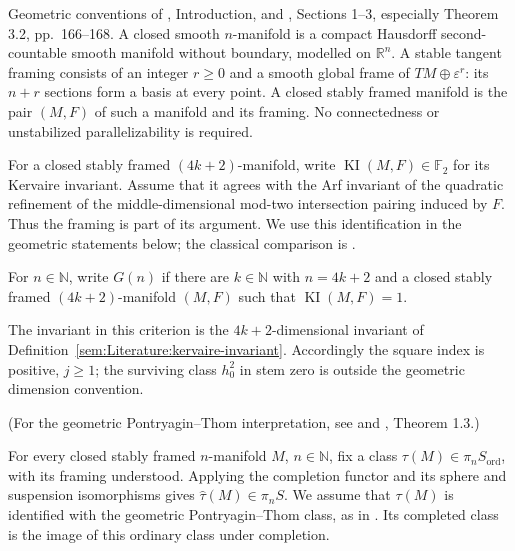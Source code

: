 \begin{definition}
\label{sem:Literature:closed-framed-manifolds}
\label{sem:Literature:kervaire-invariant}
\label{sem:Literature:kervaire-existence}
Geometric conventions of \cite{LWX126}, Introduction, and
\cite{Browder}, Sections 1--3, especially Theorem 3.2, pp.~166--168.
A closed smooth $n$-manifold is a compact Hausdorff second-countable
smooth manifold without boundary, modelled on $\mathbb R^n$.
A stable tangent framing consists of an integer $r\ge0$ and a smooth
global frame of $TM\oplus\varepsilon^r$: its $n+r$ sections form a
basis at every point. A closed stably framed manifold is the pair
$(M,F)$ of such a manifold and its framing. No connectedness or
unstabilized parallelizability is required.

For a closed stably framed $(4k+2)$-manifold, write
$\operatorname{KI}(M,F)\in\mathbb F_2$ for its Kervaire invariant.
Assume that it agrees with the Arf invariant of the quadratic refinement
of the middle-dimensional mod-two intersection pairing induced by $F$.
Thus the framing is part of its argument. We use this identification
in the geometric statements below; the classical comparison is
\cite[Theorem 3.2]{Browder}.

For $n\in\mathbb N$, write $G(n)$ if there are $k\in\mathbb N$ with
$n=4k+2$ and a closed stably framed $(4k+2)$-manifold $(M,F)$ such that
$\operatorname{KI}(M,F)=1$.

\end{definition}

The invariant in this criterion is the $4k+2$-dimensional invariant of
Definition~\ref{sem:Literature:kervaire-invariant}. Accordingly the square
index is positive, $j\geq1$; the surviving class $h_0^2$ in stem zero is
outside the geometric dimension convention.

\begin{definition}
\label{sem:Literature:pontryagin-thom-completion}
(For the geometric Pontryagin--Thom interpretation, see \cite{Browder}
and \cite{LWX126}, Theorem 1.3.)\par
{}
For every closed stably framed $n$-manifold $M$, $n\in\mathbb N$,
fix a class $\tau(M)\in\pi_n S_{\mathrm{ord}}$, with its framing
understood.
Applying the completion functor and its sphere and suspension
isomorphisms gives $\widehat\tau(M)\in\pi_n S$.
We assume that $\tau(M)$ is identified with the geometric
Pontryagin--Thom class, as in \cite[Section 7]{Browder}. Its completed
class is the image of this ordinary class under completion.

\end{definition}

